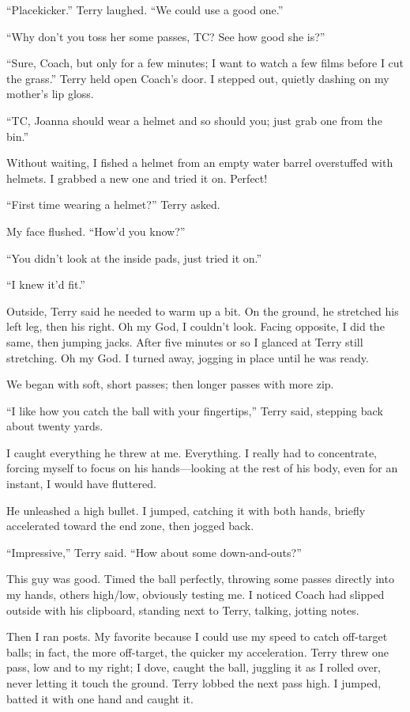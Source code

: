 ``Placekicker.'' Terry laughed. ``We could use a good one.''

``Why don't you toss her some passes, TC? See how good she is?''

``Sure, Coach, but only for a few minutes; I want to watch a few films
before I cut the grass.'' Terry held open Coach's door. I stepped out,
quietly dashing on my mother's lip gloss.

``TC, Joanna should wear a helmet and so should you; just grab one from
the bin.''

Without waiting, I fished a helmet from an empty water barrel
overstuffed with helmets. I grabbed a new one and tried it on. Perfect!

``First time wearing a helmet?'' Terry asked.

My face flushed. ``How'd you know?''

``You didn't look at the inside pads, just tried it on.''

``I knew it'd fit.''

Outside, Terry said he needed to warm up a bit. On the ground, he
stretched his left leg, then his right. Oh my God, I couldn't look.
Facing opposite, I did the same, then jumping jacks. After five minutes
or so I glanced at Terry still stretching. Oh my God. I turned away,
jogging in place until he was ready.

We began with soft, short passes; then longer passes with more zip.

``I like how you catch the ball with your fingertips,'' Terry said,
stepping back about twenty yards.

I caught everything he threw at me. Everything. I really had to
concentrate, forcing myself to focus on his hands---looking at the rest
of his body, even for an instant, I would have fluttered.

He unleashed a high bullet. I jumped, catching it with both hands,
briefly accelerated toward the end zone, then jogged back.

``Impressive,'' Terry said. ``How about some down-and-outs?''

This guy was good. Timed the ball perfectly, throwing some passes
directly into my hands, others high/low, obviously testing me. I noticed
Coach had slipped outside with his clipboard, standing next to Terry,
talking, jotting notes.

Then I ran posts. My favorite because I could use my speed to catch
off-target balls; in fact, the more off-target, the quicker my
acceleration. Terry threw one pass, low and to my right; I dove, caught
the ball, juggling it as I rolled over, never letting it touch the
ground. Terry lobbed the next pass high. I jumped, batted it with one
hand and caught it.

